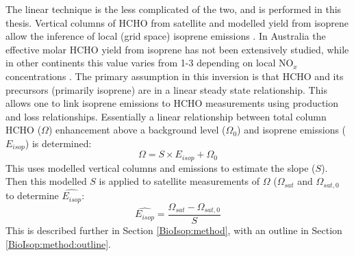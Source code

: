       The linear technique is the less complicated of the two, and is performed in this thesis.
      Vertical columns of HCHO from satellite and modelled yield from isoprene allow the inference of local (grid space) isoprene emissions \parencite{Palmer2003, Millet2006,Marais2012,Bauwens2016}.
      In Australia the effective molar HCHO yield from isoprene has not been extensively studied, while in other continents this value varies from 1-3 depending on local NO$_x$ concentrations \parencite[e.g.][]{Palmer2006, Millet2006, Bauwens2016, Surl2018}.
      The primary assumption in this inversion is that HCHO and its precursors (primarily isoprene) are in a linear steady state relationship.
      This allows one to link isoprene emissions to HCHO measurements using production and loss relationships.
      Essentially a linear relationship between total column HCHO ($\Omega$) enhancement above a background level ($\Omega_0$) and isoprene emissions ($E_{isop}$) is determined:
      \begin{equation*}
        \Omega = S \times E_{isop} + \Omega_0
      \end{equation*}
      This uses modelled vertical columns and emissions to estimate the slope ($S$).
      Then this modelled $S$ is applied to satellite measurements of $\Omega$ ($\Omega_{sat}$ and $\Omega_{sat,0}$ to determine $\hat{E_{isop}}$:
      \begin{equation*}
        \hat{E_{isop}} = \frac{\Omega_{sat} - \Omega_{sat,0}}{S}
      \end{equation*}
      This is described further in Section \ref{BioIsop:method}, with an outline in Section \ref{BioIsop:method:outline}.
      
